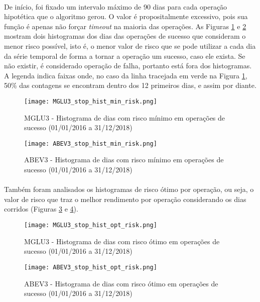\paragraph{} De início, foi fixado um intervalo máximo de 90 dias para cada operação hipotética que o algoritmo gerou. O valor é propositalmente excessivo, pois sua função é apenas não forçar \textit{timeout} na maioria das operações. As Figuras \ref{fig:120} e \ref{fig:121} mostram dois histogramas dos dias das operações de sucesso que consideram o menor risco possível, isto é, o menor valor de risco que se pode utilizar a cada dia da série temporal de forma a tornar a operação um sucesso, caso ele exista. Se não existir, é considerado operação de falha, portanto está fora dos histogramas. A legenda indica faixas onde, no caso da linha tracejada em verde na Figura \ref{fig:120}, 50\% das contagens se encontram dentro dos 12 primeiros dias, e assim por diante.

\begin{figure}[!htb]
    \texttt{[image: MGLU3\_stop\_hist\_min\_risk.png]}
    \centering
    \caption{MGLU3 - Histograma de dias com risco mínimo em operações de sucesso (01/01/2016 a 31/12/2018)}
    \label{fig:120}
\end{figure}

\begin{figure}[!htb]
    \texttt{[image: ABEV3\_stop\_hist\_min\_risk.png]}
    \centering
    \caption{ABEV3 - Histograma de dias com risco mínimo em operações de sucesso (01/01/2016 a 31/12/2018)}
    \label{fig:121}
\end{figure}

\paragraph{} Também foram analisados os histogramas de risco ótimo por operação, ou seja, o valor de risco que traz o melhor rendimento por operação considerando os dias corridos (Figuras \ref{fig:122} e \ref{fig:123}).

\begin{figure}[!htb]
    \texttt{[image: MGLU3\_stop\_hist\_opt\_risk.png]}
    \centering
    \caption{MGLU3 - Histograma de dias com risco ótimo em operações de sucesso (01/01/2016 a 31/12/2018)}
    \label{fig:122}
\end{figure}

\begin{figure}[!htb]
    \texttt{[image: ABEV3\_stop\_hist\_opt\_risk.png]}
    \centering
    \caption{ABEV3 - Histograma de dias com risco ótimo em operações de sucesso (01/01/2016 a 31/12/2018)}
    \label{fig:123}
\end{figure}

